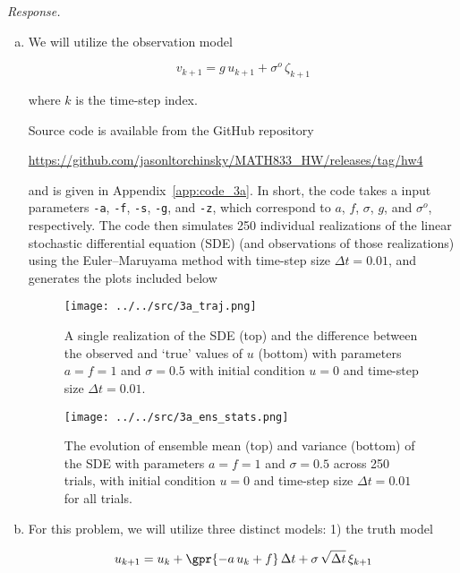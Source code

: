\textit{Response.}

\begin{enumerate}[a)]
	\item We will utilize the observation model
	
	\begin{equation}
		v_{k+1} = g\,u_{k+1} + \sigma^{o}\,\zeta_{k+1}
	\end{equation}
	
	where $k$ is the time-step index.
	
	Source code is available from the GitHub repository
	
	\begin{center}
		\url{https://github.com/jasonltorchinsky/MATH833_HW/releases/tag/hw4}
	\end{center}

	and is given in Appendix~\ref{app:code_3a}. In short, the code takes a input parameters \texttt{-a}, \texttt{-f}, \texttt{-s}, \texttt{-g}, and \texttt{-z}, which correspond to $a$, $f$, $\sigma$, $g$, and $\sigma^{o}$, respectively. The code then simulates 250 individual realizations of the linear stochastic differential equation (SDE) (and observations of those realizations) using the Euler--Maruyama method with time-step size $\Delta t = 0.01$, and generates the plots included below
	
	\begin{figure}[H]
		\centering
		\texttt{[image: ../../src/3a\_traj.png]}
		\caption{A single realization of the SDE (top) and the difference between the observed and `true' values of $u$ (bottom) with parameters $a = f = 1$ and $\sigma = 0.5$ with initial condition $u = 0$ and time-step size $\Delta t = 0.01$. }
		\label{fig:3a_traj}
	\end{figure}
	
	\begin{figure}[H]
		\centering
		\texttt{[image: ../../src/3a\_ens\_stats.png]}
		\caption{The evolution of ensemble mean (top) and variance (bottom) of the SDE with parameters $a = f = 1$ and $\sigma = 0.5$ across 250 trials, with initial condition $u = 0$ and time-step size $\Delta t = 0.01$ for all trials. }
		\label{fig:3a_ens_stats}
	\end{figure}
	
	\item For this problem, we will utilize three distinct models: 1) the truth model
	
	\begin{equation}
		u_{k+1} = u_{k} + \gpr{-a\,u_{k} + f}\,\Delta t + \sigma\,\sqrt{\Delta t}\,\xi_{k+1}
	\end{equation}
	

\end{enumerate}
